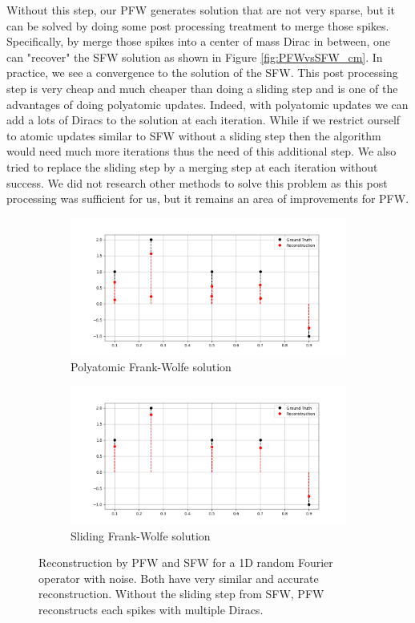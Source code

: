 \documentclass[a4paper,12pt,oneside]{report}
\theoremstyle{named}
\begin{document}
Without this step, our PFW generates solution that are not very sparse, but it can be solved by doing some post processing  treatment to merge those spikes. Specifically, by merge those spikes into a center of mass Dirac in between, one can "recover" the SFW solution as shown in Figure \ref{fig:PFWvsSFW_cm}. In practice, we see a convergence to the solution of the SFW. This post processing step is very cheap and much cheaper than doing a sliding step and is one of the advantages of doing polyatomic updates. Indeed, with polyatomic updates we can add a lots of Diracs to the solution at each iteration. While if we restrict ourself to atomic updates similar to SFW without a sliding step then the algorithm would need much more iterations thus the need of this additional step. We also tried to replace the sliding step by a merging step at each iteration without success. We did not research other methods to solve this problem as this post processing was sufficient for us, but it remains an area of improvements for PFW.


\begin{figure}
\centering
\begin{subfigure}[b]{1\textwidth}
   \includegraphics[width=1\linewidth]{PFW.png}
   \caption{Polyatomic Frank-Wolfe solution}
   \label{fig:PFW} 
\end{subfigure}

\begin{subfigure}[b]{1\textwidth}
   \includegraphics[width=1\linewidth]{SFW.png}
   \caption{Sliding Frank-Wolfe solution}
   \label{fig:SFW}
\end{subfigure}

\caption{Reconstruction by PFW and SFW for a 1D random Fourier operator with noise. Both have very similar and accurate reconstruction. Without the sliding step from SFW, PFW reconstructs each spikes with multiple Diracs.}
\label{fig:PFWvsSFW}
\end{figure}
\end{document}
